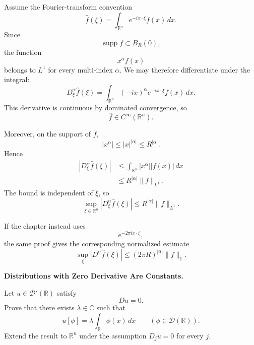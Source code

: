 \begin{solution}
Assume the Fourier-transform convention
\[
\widehat f(\xi)
=
\int_{\mathbb R^n}e^{-ix\cdot\xi}f(x)\,dx.
\]
Since
\[
\operatorname{supp}f\subset B_R(0),
\]
the function
\[
x^\alpha f(x)
\]
belongs to \(L^1\) for every multi-index \(\alpha\). We may therefore differentiate under the integral:
\[
D_\xi^\alpha\widehat f(\xi)
=
\int_{\mathbb R^n}
(-ix)^\alpha e^{-ix\cdot\xi}f(x)\,dx.
\]
This derivative is continuous by dominated convergence, so
\[
\widehat f\in C^\infty(\mathbb R^n).
\]

Moreover, on the support of \(f\),
\[
|x^\alpha|
\le
|x|^{|\alpha|}
\le
R^{|\alpha|}.
\]
Hence
\[
\begin{aligned}
|D_\xi^\alpha\widehat f(\xi)|
&\le
\int_{\mathbb R^n}|x^\alpha||f(x)|\,dx\\
&\le
R^{|\alpha|}\|f\|_{L^1}.
\end{aligned}
\]
The bound is independent of \(\xi\), so
\[
\boxed{
\sup_{\xi\in\mathbb R^n}
|D_\xi^\alpha\widehat f(\xi)|
\le
R^{|\alpha|}\|f\|_{L^1}.
}
\]

If the chapter instead uses
\[
e^{-2\pi ix\cdot\xi},
\]
the same proof gives the corresponding normalized estimate
\[
\sup_\xi|D^\alpha\widehat f(\xi)|
\le
(2\pi R)^{|\alpha|}\|f\|_1.
\]
\end{solution}


\begin{problem}[CP-II-0291]
\label{prob:cp-ii-0291}
\textbf{Distributions with Zero Derivative Are Constants.}

\hspace*{1.5em}Let \(u\in\mathcal D'(\mathbb R)\) satisfy
\[
Du=0.
\]
Prove that there exists \(\lambda\in\mathbb C\) such that
\[
u[\phi]
=
\lambda\int_{\mathbb R}\phi(x)\,dx
\qquad
(\phi\in\mathcal D(\mathbb R)).
\]
Extend the result to \(\mathbb R^n\) under the assumption
\(D_j u=0\) for every \(j\).
\end{problem}

